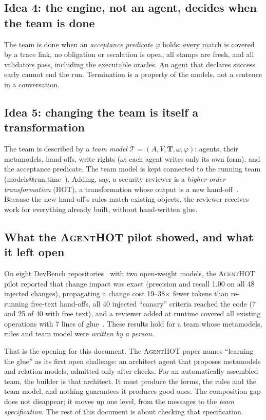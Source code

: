 \documentclass[10pt,a4paper]{article}
\newcommand{\tool}{\textsc{AgentHOT}}
\newcommand{\team}{\mathcal{T}}
\begin{document}
\subsection{Idea 4: the engine, not an agent, decides when the team is done}

The team is done when an \emph{acceptance predicate} $\varphi$ holds: every
match is covered by a trace link, no obligation or escalation is open, all
stamps are fresh, and all validators pass, including the executable
oracles. An agent that declares success early cannot end the run.
Termination is a property of the models, not a sentence in a conversation.

\subsection{Idea 5: changing the team is itself a transformation}

The team is described by a \emph{team model}
$\team=(A,V,\mathbf{T},\omega,\varphi)$: agents, their metamodels,
hand-offs, write rights ($\omega$: each agent writes only its own form),
and the acceptance predicate. The team model is kept connected to the
running team (models@run.time~\cite{blair2009runtime}). Adding, say, a
security reviewer is a \emph{higher-order transformation} (HOT), a
transformation whose output is a new hand-off~\cite{tisi2009hot}. Because
the new hand-off's rules match existing objects, the reviewer receives work
for everything already built, without hand-written glue.

\subsection{What the \tool{} pilot showed, and what it left open}

On eight DevBench repositories~\cite{li2024devbench} with two open-weight
models, the \tool{} pilot reported that change impact was exact (precision
and recall 1.00 on all 48 injected changes), propagating a change cost
19--38$\times$ fewer tokens than re-running free-text hand-offs, all 40
injected ``canary'' criteria reached the code (7 and 25 of 40 with free
text), and a reviewer added at runtime covered all existing operations with
7 lines of glue~\cite{agenthot2026}. These results hold for a team whose
metamodels, rules and team model were \emph{written by a person}.

That is the opening for this document. The \tool{} paper names ``learning
the glue'' as its first open challenge: an architect agent that proposes
metamodels and relation models, admitted only after checks. For an
automatically assembled team, the builder is that architect. It must
produce the forms, the rules and the team model, and nothing guarantees it
produces good ones. The composition gap does not disappear; it moves up one
level, from the messages to the \emph{team specification}. The rest of this
document is about checking that specification.
\end{document}
